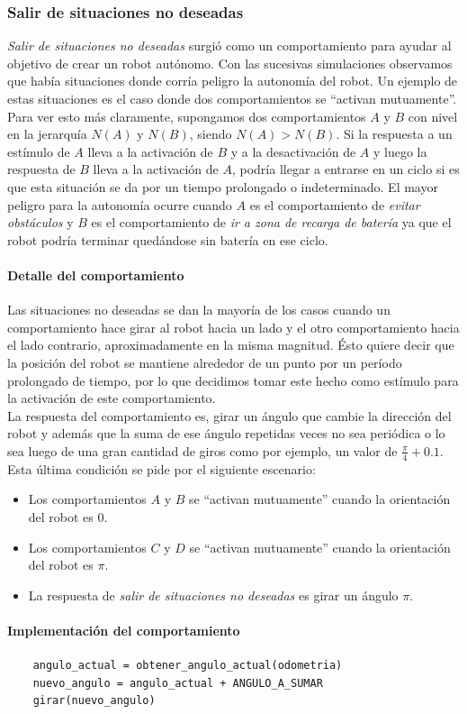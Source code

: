 \subsubsection{Salir de situaciones no deseadas}
\label{out_of_unwanted_situations}
\emph{Salir de situaciones no deseadas} surgi\'o como un comportamiento
para ayudar al objetivo de crear un robot aut\'onomo. Con las sucesivas
simulaciones observamos que hab\'ia situaciones donde corr\'ia
peligro la autonom\'ia del robot. Un ejemplo de estas situaciones es el caso
donde dos comportamientos se ``activan mutuamente''.
\\\indent
Para ver esto m\'as claramente, supongamos dos comportamientos $A$ y $B$ con
nivel en la jerarqu\'ia $N(A)$ y $N(B)$, siendo $N(A) > N(B)$. Si la respuesta
a un est\'imulo de $A$ lleva a la activaci\'on de $B$ y a la desactivaci\'on de
$A$ y luego la respuesta de $B$ lleva a la activaci\'on de $A$, podr\'ia llegar
a entrarse en un ciclo si es que esta situaci\'on se da por un tiempo
prolongado o indeterminado. El mayor peligro para la autonom\'ia ocurre
cuando $A$ es el comportamiento de \emph{evitar obst\'aculos} y $B$ es el
comportamiento de \emph{ir a zona de recarga de bater\'ia} ya que el robot
podr\'ia terminar qued\'andose sin bater\'ia en ese ciclo.

\paragraph{Detalle del comportamiento}
Las situaciones no deseadas se dan la mayor\'ia de los casos cuando un
comportamiento hace girar al robot hacia un lado y el otro comportamiento hacia
el lado contrario, aproximadamente en la misma magnitud. \'Esto quiere decir
que la posici\'on del robot se mantiene alrededor de un punto por un per\'iodo
prolongado de tiempo, por lo que decidimos tomar este hecho como est\'imulo
para la activaci\'on de este comportamiento.
\\\indent
La respuesta del comportamiento es, girar un \'angulo que cambie la
direcci\'on del robot y adem\'as que la suma de ese \'angulo repetidas veces no
sea peri\'odica o lo sea luego de una gran cantidad de giros como por ejemplo,
un valor de $\frac{\pi}{4}+0.1$.
Esta \'ultima condici\'on se pide por el siguiente escenario:
\begin{itemize}
	\item Los comportamientos $A$ y $B$ se ``activan mutuamente'' cuando la
		orientaci\'on del robot es $0$.
	\item Los comportamientos $C$ y $D$ se ``activan mutuamente'' cuando la
		orientaci\'on del robot es $\pi$.
	\item La respuesta de \emph{salir de situaciones no deseadas} es girar un
		\'angulo $\pi$.
\end{itemize}

\paragraph{Implementaci\'on del comportamiento}
\begin{verbatim}
    angulo_actual = obtener_angulo_actual(odometria)
    nuevo_angulo = angulo_actual + ANGULO_A_SUMAR
    girar(nuevo_angulo)
\end{verbatim}


